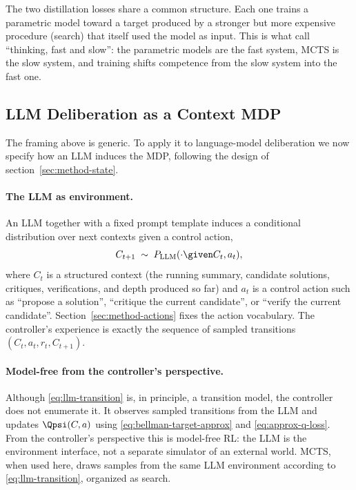 The two distillation losses share a common structure. Each one trains a
parametric model toward a target produced by a stronger but more
expensive procedure (search) that itself used the model as input. This
is what \citet{anthony2017thinking} call ``thinking, fast and slow'':
the parametric models are the fast system, MCTS is the slow system, and
training shifts competence from the slow system into the fast one.

\subsection{LLM Deliberation as a Context MDP}
\label{sec:background-llm-mdp}

The framing above is generic. To apply it to language-model
deliberation we now specify how an LLM induces the MDP, following the
design of section~\ref{sec:method-state}.

\paragraph{The LLM as environment.}
An LLM together with a fixed prompt template induces a conditional
distribution over next contexts given a control action,
\begin{equation}
C_{t+1} \;\sim\; P_{\mathrm{LLM}}(\cdot \given C_t, a_t),
\label{eq:llm-transition}
\end{equation}
where $C_t$ is a structured context (the running summary, candidate
solutions, critiques, verifications, and depth produced so far) and
$a_t$ is a control action such as ``propose a solution'', ``critique
the current candidate'', or ``verify the current candidate''.
Section~\ref{sec:method-actions} fixes the action vocabulary. The
controller's experience is exactly the sequence of sampled transitions
$(C_t, a_t, r_t, C_{t+1})$.

\paragraph{Model-free from the controller's perspective.}
Although \eqref{eq:llm-transition} is, in principle, a transition model,
the controller does not enumerate it. It observes sampled transitions
from the LLM and updates $\Qpsi(C, a)$ using
\eqref{eq:bellman-target-approx} and \eqref{eq:approx-q-loss}. From the
controller's perspective this is model-free RL: the LLM is the
environment interface, not a separate simulator of an external world.
MCTS, when used here, draws samples from the same LLM environment
according to \eqref{eq:llm-transition}, organized as search.

